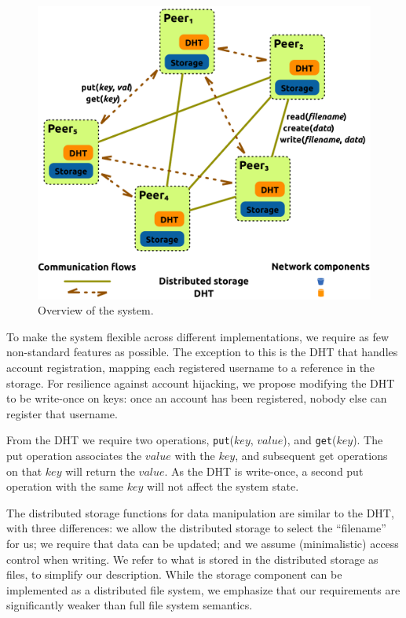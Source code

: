\begin{figure}
  \centering
  \includegraphics[width=.88\textwidth]{images/passwords-peer-to-peer/system-overview-fully-distributed}
  \caption{Overview of the system.}
\end{figure}

To make the system flexible across different implementations, we require as few non-standard features as
possible. The exception to this is the DHT that handles
account registration, mapping each registered username to a reference
in the storage.  For resilience against account hijacking,
we propose modifying the DHT to be write-once on keys:
once an account has been registered, nobody else can register that
username.

From the DHT we require two operations, \texttt{put}($key$, $value$), and
\texttt{get}($key$). The put operation associates the $value$ with the
$key$, and subsequent get operations on that $key$ will return the $value$.
As the DHT is write-once, a second put operation with the same $key$ will not
affect the system state.

The distributed storage functions for data
manipulation are similar to the DHT, with three
differences: we allow the distributed storage to select the ``filename'' for
us; we require that data can be updated; and we assume (minimalistic) access
control when writing. We refer to what is stored in the distributed storage as
files, to simplify our description. While the storage component
can be implemented as a distributed file system, we emphasize that our
requirements are significantly weaker than full file system semantics.


